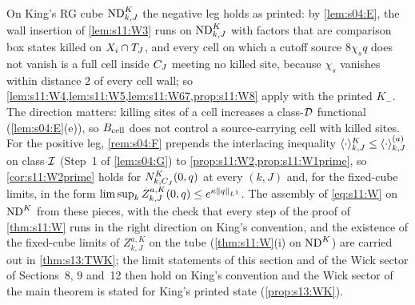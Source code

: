 \begin{remark}\label{rem:s11:Kconvention}
On King's RG cube $\mathrm{ND}^{K}_{k,J}$ the negative leg holds as printed: by \cref{lem:s04:E}, the wall insertion of \cref{lem:s11:W3} runs on $\mathrm{ND}^{K}_{k,J}$ with factors that are comparison box states killed on $X_i\cap T_J$, and every cell on which a cutoff source $8\chi_sq$ does not vanish is a full cell inside $C_J$ meeting no killed site, because $\chi_s$ vanishes within distance $2$ of every cell wall; so \cref{lem:s11:W4,lem:s11:W5,lem:s11:W67,prop:s11:W8} apply with the printed $K_-$. The direction matters: killing sites of a cell increases a class-$\mathcal D$ functional (\cref{lem:s04:E}(e)), so $B_{\rm cell}$ does not control a source-carrying cell with killed sites. For the positive leg, \cref{rem:s04:F} prepends the interlacing inequality $\langle \cdot\rangle^{K}_{k,J}\le\langle \cdot\rangle^{(a)}_{k,J}$ on class $\mathcal I$ (Step~1 of \cref{lem:s04:G}) to \cref{prop:s11:W2,prop:s11:W1prime}, so \cref{cor:s11:W2prime} holds for $N^K_{k,C_J}(0,q)$ at every $(k,J)$ and, for the fixed-cube limits, in the form $\limsup_kZ^{a,K}_{k,J}(0,q)\le e^{\kappa\lVert q\rVert_{L^1}}$. The assembly of \eqref{eq:s11:W} on $\mathrm{ND}^{K}$ from these pieces, with the check that every step of the proof of \cref{thm:s11:W} runs in the right direction on King's convention, and the existence of the fixed-cube limits of $Z^{a,K}_{k,J}$ on the tube (\cref{thm:s11:W}(i) on $\mathrm{ND}^{K}$) are carried out in \cref{thm:s13:TWK}; the limit statements of this section and of the Wick sector of Sections~8, 9 and~12 then hold on King's convention and the Wick sector of the main theorem is stated for King's printed state (\cref{prop:s13:WK}).
\end{remark}
